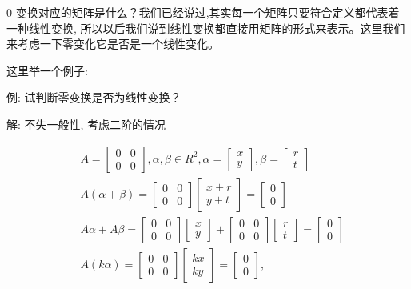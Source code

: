 0 变换对应的矩阵是什么？我们已经说过,其实每一个矩阵只要符合定义都代表着一种线性变换, 所以以后我们说到线性变换都直接用矩阵的形式来表示。这里我们来考虑一下零变化它是否是一个线性变化。

这里举一个例子: 

例: 试判断零变换是否为线性变换？

解: 不失一般性, 考虑二阶的情况

\begin{align*}
  & A = \begin{bmatrix} 0 & 0 \\ 0 & 0 \end{bmatrix}, \alpha,\beta \in R^2,  \alpha=\begin{bmatrix}  x \\ y\end{bmatrix} , \beta = \begin{bmatrix} r \\ t\end{bmatrix} \\
  & A(\alpha+\beta) = \begin{bmatrix} 0&0\\0&0\end{bmatrix}\begin{bmatrix} x+r \\ y+t \end{bmatrix} = \begin{bmatrix} 0 \\ 0 \end{bmatrix} \\
  & A\alpha+A\beta = \begin{bmatrix} 0&0\\0&0\end{bmatrix}\begin{bmatrix} x \\ y \end{bmatrix} + \begin{bmatrix} 0&0\\0&0\end{bmatrix}\begin{bmatrix} r \\ t \end{bmatrix}  = \begin{bmatrix} 0 \\ 0 \end{bmatrix} \\
  & A(k\alpha) = \begin{bmatrix} 0 & 0 \\ 0 & 0\end{bmatrix}\begin{bmatrix}kx \\ ky \end{bmatrix} = \begin{bmatrix} 0 \\ 0 \end{bmatrix}, \\

\end{align*}
